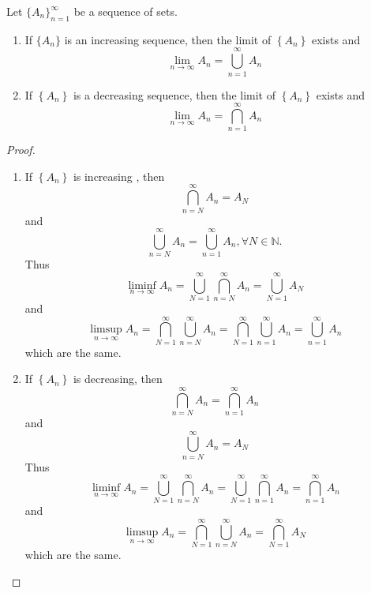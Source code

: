 \documentclass[../main.tex]{subfiles}
\begin{document}
\begin{proposition}{}{}
     Let $\{A_n\}_{n=1}^\infty$ be a sequence of sets.
     \begin{enumerate}
        \item If $\{A_n\}$ is an increasing sequence, then the limit of \(  \left\{ A_{n} \right\}   \) exists and \[
        \lim_{n\to \infty}A_{n}= \bigcup _{n = 1}^{\infty}A_{n}
        \]
        \item If \(  \left\{ A_{n} \right\}  \) is a decreasing sequence, then the limit of \(  \left\{ A_{n} \right\}   \) exists and  \[
        \lim_{n\to \infty}A_{n}= \bigcap_{n = 1}^{\infty}A_{n} 
        \] 
     \end{enumerate}
     
\end{proposition}
\begin{proof}
    \begin{enumerate}
        \item If \(  \left\{ A_{n} \right\}  \) is increasing , then  \[
        \bigcap_{n = N}^{\infty}A_{n}= A_{N} 
        \]and\[ 
       \bigcup _{n = N}^{\infty}A_{n}= \bigcup _{n =  1}^{\infty}A_{n},\forall N\in \mathbb{N} .
        \] Thus \[
        \liminf_{n \to \infty} A_n = \bigcup_{N=1}^\infty \bigcap_{n=N}^\infty A_n = \bigcup _{N = 1}^{\infty}A_{N}
        \] and\[
        \limsup_{n \to \infty} A_n = \bigcap_{N= 1}^{\infty}\bigcup _{n = N}^{\infty}A_{n}=  \bigcap_{N = 1}^{\infty} \bigcup _{n = 1}^{\infty}A_{n}=  \bigcup _{n = 1}^{\infty}A_{n}  
        \]which are the same.
        \item If \(  \left\{ A_{n} \right\}  \) is decreasing, then \[
        \bigcap_{n = N}^{\infty}A_{n}= \bigcap_{n = 1}^{\infty}A_{n}  
        \] and \[
        \bigcup _{n = N}^{\infty}A_{n}= A_{N}
        \]Thus  \[
        \liminf_{n \to \infty} A_n = \bigcup_{N=1}^\infty \bigcap_{n=N}^\infty A_n = \bigcup _{N = 1}^{\infty}\bigcap_{n = 1}^{\infty}A_{n}= \bigcap_{n = 1}^{\infty}A_{n}  
        \] and\[
        \limsup_{n \to \infty} A_n = \bigcap_{N= 1}^{\infty}\bigcup _{n = N}^{\infty}A_{n}= \bigcap_{N = 1}^{\infty}A_{N}   
        \]which are the same.
    \end{enumerate}
    
\end{proof}
\end{document}
